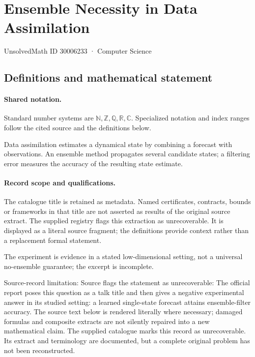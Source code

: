 \documentclass[11pt]{article}
\begin{document}
\setcounter{section}{30006232}
\section{Ensemble Necessity in Data Assimilation}\label{30006233}
{\small\sffamily UnsolvedMath ID 30006233 · Computer Science}
\subsection{Definitions and mathematical statement}

\paragraph{Shared notation.}Standard number systems are $\mathbb N,\mathbb Z,\mathbb Q,\mathbb R,\mathbb C$. Specialized notation and index ranges follow the cited source and the definitions below.


Data assimilation estimates a dynamical state by combining a forecast with observations. An ensemble method propagates several candidate states; a filtering error measures the accuracy of the resulting state estimate.
\paragraph{Record scope and qualifications.}
The catalogue title is retained as metadata. Named certificates, contracts, bounds or frameworks in that title are not asserted as results of the original source extract.
The supplied registry flags this extraction as unrecoverable. It is displayed as a literal source fragment; the definitions provide context rather than a replacement formal statement.

The experiment is evidence in a stated low-dimensional setting, not a universal no-ensemble guarantee; the excerpt is incomplete.

Source-record limitation: Source flags the statement as unrecoverable: The official report poses this question as a talk title and then gives a negative experimental answer in its studied setting: a learned single-state forecast attains ensemble-filter accuracy.
The source text below is rendered literally where necessary; damaged formulas and composite extracts are not silently repaired into a new mathematical claim.
The supplied catalogue marks this record as unrecoverable. Its extract and terminology are documented, but a complete original problem has not been reconstructed.
\end{document}
